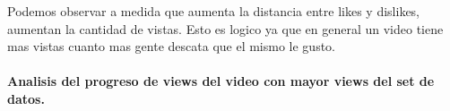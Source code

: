             \begin{figure}[ht]
            \end{figure}
        \FloatBarrier
        Podemos observar a medida que aumenta la distancia entre likes y dislikes,
        aumentan la cantidad de vistas. Esto es logico ya que en general un video
        tiene mas vistas cuanto mas gente descata que el mismo le gusto.

        \newpage
        \paragraph{Analisis del progreso de views del video con mayor views del set de datos.}

